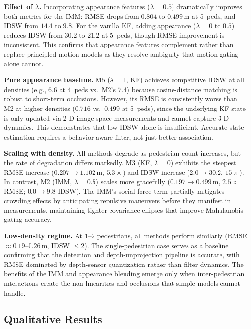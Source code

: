 \documentclass[conference]{IEEEtran}
\begin{document}
\textbf{Effect of $\lambda$.}
Incorporating appearance features ($\lambda{=}0.5$) dramatically improves both metrics for the IMM: RMSE drops from $0.804$ to $0.499\,\text{m}$ at 5~peds, and IDSW from $14.4$ to $9.8$. For the vanilla KF, adding appearance ($\lambda{=}0$ to $0.5$) reduces IDSW from $30.2$ to $21.2$ at 5~peds, though RMSE improvement is inconsistent. This confirms that appearance features complement rather than replace principled motion models as they resolve ambiguity that motion gating alone cannot.

\textbf{Pure appearance baseline.}
M5 ($\lambda{=}1$, KF) achieves competitive IDSW at all densities (e.g., $6.6$ at 4~peds vs.\ M2's $7.4$) because cosine-distance matching is robust to short-term occlusions. However, its RMSE is consistently worse than M2 at higher densities ($0.716$ vs.\ $0.499$ at 5~peds), since the underlying KF state is only updated via 2-D image-space measurements and cannot capture 3-D dynamics. This demonstrates that low IDSW alone is insufficient. Accurate state estimation requires a behavior-aware filter, not just better association.

\textbf{Scaling with density.}
All methods degrade as pedestrian count increases, but the rate of degradation differs markedly. M3 (KF, $\lambda{=}0$) exhibits the steepest RMSE increase ($0.207 \to 1.102\,\text{m}$, $5.3\times$) and IDSW increase ($2.0 \to 30.2$, $15\times$). In contrast, M2 (IMM, $\lambda{=}0.5$) scales more gracefully ($0.197 \to 0.499\,\text{m}$, $2.5\times$ RMSE; $0.0 \to 9.8$ IDSW). The IMM's social force term partially mitigates crowding effects by anticipating repulsive maneuvers before they manifest in measurements, maintaining tighter covariance ellipses that improve Mahalanobis gating accuracy.

\textbf{Low-density regime.}
At 1--2 pedestrians, all methods perform similarly (RMSE $\approx 0.19$--$0.26\,\text{m}$, IDSW $\leq 2$). The single-pedestrian case serves as a baseline confirming that the detection and depth-unprojection pipeline is accurate, with RMSE dominated by depth-sensor quantization rather than filter dynamics. The benefits of the IMM and appearance blending emerge only when inter-pedestrian interactions create the non-linearities and occlusions that simple models cannot handle.

\subsection{Qualitative Results}
\end{document}
